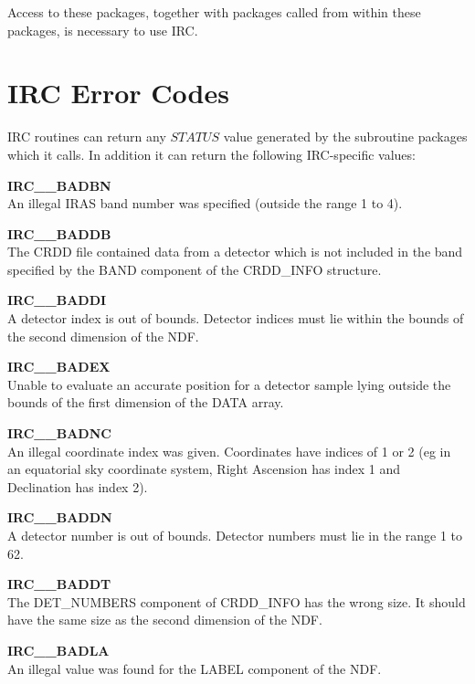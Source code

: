 Access to these packages, together with packages called from within these
packages, is necessary to use IRC.

\section {IRC Error Codes}
\label {APP:ERRORS}
IRC routines can return any $STATUS$ value generated by the subroutine packages
which it calls. In addition it can return the following IRC-specific values:

\begin{description}

\item {\bf IRC\_\_BADBN     }\\
An illegal IRAS band number was specified (outside the range 1 to 4).

\item {\bf IRC\_\_BADDB     }\\
The CRDD file contained data from a detector which is not included in the band
specified by the BAND component of the CRDD\_INFO structure.

\item {\bf IRC\_\_BADDI     }\\
A detector index is out of bounds. Detector indices must lie within the bounds
of the second dimension of the NDF.

\item {\bf IRC\_\_BADEX     }\\
Unable to evaluate an accurate position for a detector sample lying outside the
bounds of the first dimension of the DATA array.

\item {\bf IRC\_\_BADNC     }\\
An illegal coordinate index was given. Coordinates have indices of 1 or 2 (eg
in an equatorial sky coordinate system, Right Ascension has index 1 and
Declination has index 2).

\item {\bf IRC\_\_BADDN     }\\
A detector number is out of bounds. Detector numbers must lie in the range
1 to 62.

\item {\bf IRC\_\_BADDT     }\\
The DET\_NUMBERS component of CRDD\_INFO has the wrong size. It should have the
same size as the second dimension of the NDF.

\item {\bf IRC\_\_BADLA     }\\
An illegal value was found for the LABEL component of the NDF.


\end{description}
